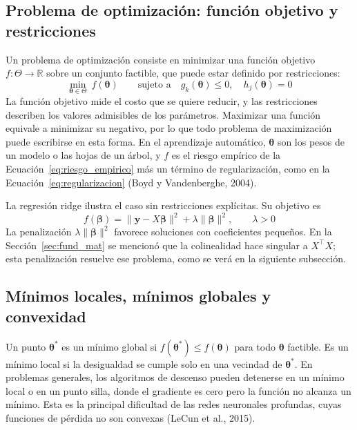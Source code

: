 \subsection{Problema de optimización: función objetivo y restricciones}
Un problema de optimización consiste en minimizar una función objetivo $f:\Theta\to\mathbb{R}$ sobre un conjunto factible, que puede estar definido por restricciones:
\begin{equation}
\min_{\boldsymbol{\theta}\in\Theta}\ f(\boldsymbol{\theta}) \qquad \text{sujeto a} \quad g_k(\boldsymbol{\theta})\leq 0,\quad h_j(\boldsymbol{\theta})=0
\label{eq:opt_problema}
\end{equation}
La función objetivo mide el costo que se quiere reducir, y las restricciones describen los valores admisibles de los parámetros. Maximizar una función equivale a minimizar su negativo, por lo que todo problema de maximización puede escribirse en esta forma. En el aprendizaje automático, $\boldsymbol{\theta}$ son los pesos de un modelo o las hojas de un árbol, y $f$ es el riesgo empírico de la Ecuación~\eqref{eq:riesgo_empirico} más un término de regularización, como en la Ecuación~\eqref{eq:regularizacion} (Boyd y Vandenberghe, 2004).

La regresión ridge ilustra el caso sin restricciones explícitas. Su objetivo es
\begin{equation}
f(\boldsymbol{\beta})=\|\mathbf{y}-X\boldsymbol{\beta}\|^2+\lambda\|\boldsymbol{\beta}\|^2, \qquad \lambda>0
\label{eq:ridge_objetivo}
\end{equation}
La penalización $\lambda\|\boldsymbol{\beta}\|^2$ favorece soluciones con coeficientes pequeños. En la Sección~\ref{sec:fund_mat} se mencionó que la colinealidad hace singular a $X^\top X$; esta penalización resuelve ese problema, como se verá en la siguiente subsección.

\subsection{Mínimos locales, mínimos globales y convexidad}
Un punto $\boldsymbol{\theta}^{*}$ es un mínimo global si $f(\boldsymbol{\theta}^{*})\leq f(\boldsymbol{\theta})$ para todo $\boldsymbol{\theta}$ factible. Es un mínimo local si la desigualdad se cumple solo en una vecindad de $\boldsymbol{\theta}^{*}$. En problemas generales, los algoritmos de descenso pueden detenerse en un mínimo local o en un punto silla, donde el gradiente es cero pero la función no alcanza un mínimo. Esta es la principal dificultad de las redes neuronales profundas, cuyas funciones de pérdida no son convexas (LeCun et al., 2015).

